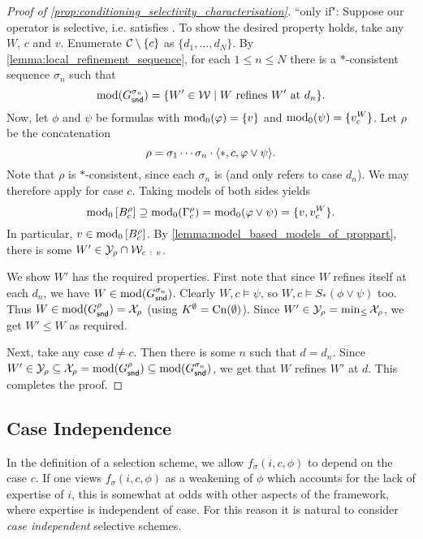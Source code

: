 \begin{proof}[Proof of \cref{prop:conditioning_selectivity_characterisation}]
    ``only if": Suppose our operator is selective, i.e. satisfies
    \boundedness{}. To show the desired property holds, take any $W$, $c$ and
    $v$. Enumerate $\mathcal{C} \setminus \{c\}$ as $\{d_1, \ldots, d_N\}$. By
    \cref{lemma:local_refinement_sequence}, for each $1 \le n \le N$ there is a
    $\ast$-consistent sequence $\sigma_n$ such that
    \[
        \operatorname{mod}(G^{\sigma_n}_{\mathsf{snd}})
        =
        \{W' \in \mathcal{W} \mid W \text{ refines } W' \text{ at } d_n\}.
    \]
    Now, let $\phi$ and $\psi$ be formulas with $\operatorname{mod}_0(\varphi) = \{v\}$ and
    $\operatorname{mod}_0(\psi) = \{v^W_c\}$. Let $\rho$ be the concatenation
    \[
        \rho
        =
        \sigma_1 \cdots \sigma_n \cdot
        \langle {\ast, c, \varphi\lor \psi} \rangle.
    \]
    Note that $\rho$ is $\ast$-consistent, since each $\sigma_n$ is (and only
    refers to case $d_n$). We may therefore apply \boundedness{} for case $c$.
    Taking models of both sides yields
    \[
        \operatorname{mod}_0\left[{B^\rho_c}\right]
        \supseteq \operatorname{mod}_0(\Gamma^\rho_c)
        = \operatorname{mod}_0(\varphi \lor \psi)
        = \{v, v^W_c\}.
    \]
    In particular, $v \in \operatorname{mod}_0\left[{B^\rho_c}\right]$. By
    \cref{lemma:model_based_models_of_proppart}, there is some $W' \in \mathcal{Y}_\rho
    \cap \mathcal{W}_{c\ :\ v}$.

    We show $W'$ has the required properties. First note that since $W$ refines
    itself at each $d_n$, we have $W \in \operatorname{mod}(G^{\sigma_n}_{\mathsf{snd}})$. Clearly $W,
    c \models \psi$, so $W, c \models S_\ast(\phi \lor \psi)$ too. Thus $W \in
    \operatorname{mod}(G^\rho_{\mathsf{snd}}) = \mathcal{X}_\rho$ (using $K^\emptyset = \operatorname{Cn}(\emptyset)$). Since
    $W' \in \mathcal{Y}_\rho = \min_{\le}{\mathcal{X}_\rho}$, we get $W' \le W$ as required.

    Next, take any case $d \ne c$. Then there is some $n$ such that $d = d_n$.
    Since $W' \in \mathcal{Y}_\rho \subseteq \mathcal{X}_\rho = \operatorname{mod}(G^\rho_{\mathsf{snd}}) \subseteq
    \operatorname{mod}(G^{\sigma_n}_{\mathsf{snd}})$, we get that $W$ refines $W'$ at $d$. This
    completes the proof.

\end{proof}


\subsection{Case Independence}

In the definition of a selection scheme, we allow $f_\sigma(i, c, \phi)$ to
depend on the case $c$. If one views $f_\sigma(i, c, \phi)$ as a weakening of
$\phi$ which accounts for the lack of expertise of $i$, this is somewhat at
odds with other aspects of the framework, where expertise is independent of
case. For this reason it is natural to consider \emph{case independent}
selective schemes.

